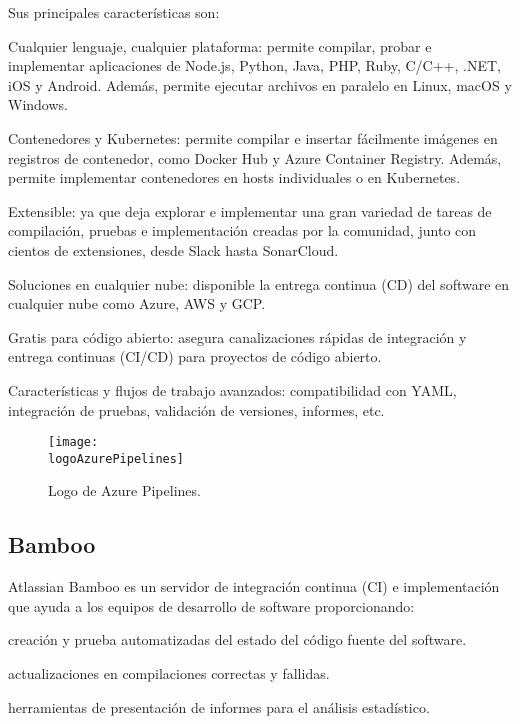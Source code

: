 Sus principales características son:
\begin{compactitem}
    \item Cualquier lenguaje, cualquier plataforma: permite compilar, probar e implementar aplicaciones de Node.js, Python, Java, PHP, Ruby, C/C++, .NET, iOS y Android. Además, permite ejecutar archivos en paralelo en Linux, macOS y Windows.
    \item Contenedores y Kubernetes: permite compilar e insertar fácilmente imágenes en registros de contenedor, como Docker Hub y Azure Container Registry. Además, permite implementar contenedores en hosts individuales o en Kubernetes.
    \item Extensible: ya que deja explorar e implementar una gran variedad de tareas de compilación, pruebas e implementación creadas por la comunidad, junto con cientos de extensiones, desde Slack hasta SonarCloud.
    \item Soluciones en cualquier nube: disponible la entrega continua (CD) del software en cualquier nube como Azure, AWS y GCP.
    \item Gratis para código abierto: asegura canalizaciones rápidas de integración y entrega continuas (CI/CD) para proyectos de código abierto.
    \item Características y flujos de trabajo avanzados: compatibilidad con YAML, integración de pruebas, validación de versiones, informes, etc.
\end{compactitem}

\begin{figure}[h]
    \centering
    \texttt{[image: \\logoAzurePipelines]}
    \caption{Logo de Azure Pipelines.}
\end{figure}

\subsection{Bamboo}
Atlassian Bamboo es un servidor de integración continua (CI) e implementación que ayuda a los equipos de desarrollo de software proporcionando:
\begin{compactitem}
    \item creación y prueba automatizadas del estado del código fuente del software.
    \item actualizaciones en compilaciones correctas y fallidas.
    \item herramientas de presentación de informes para el análisis estadístico.
\end{compactitem}

